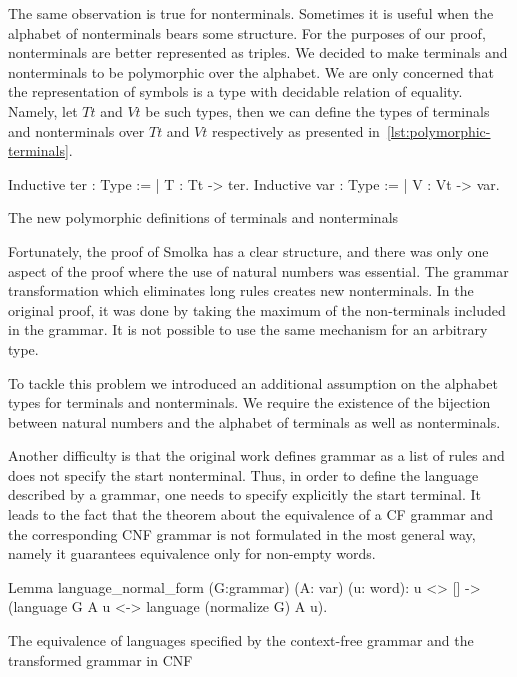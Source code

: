 The same observation is true for nonterminals. 
Sometimes it is useful when the alphabet of nonterminals bears some structure. 
For the purposes of our proof, nonterminals are better represented as triples. 
We decided to make terminals and nonterminals to be polymorphic over the alphabet.
We are only concerned that the representation of symbols is a type with decidable relation of equality. 
Namely, let $Tt$ and $Vt$ be such types, then we can define the types of terminals and nonterminals over  $Tt$ and $Vt$ respectively as presented in~\ref{lst:polymorphic-terminals}.

\begin{listing}[h]
    \begin{pyglist}[language=coq, numbers=none, numbersep=5pt]
  Inductive ter : Type := | T : Tt -> ter.
  Inductive var : Type := | V : Vt -> var.
    \end{pyglist}
    \caption{The new polymorphic definitions of terminals and nonterminals}
    \label{lst:polymorphic-terminals}
\end{listing}

Fortunately, the proof of Smolka has a clear structure, and there was only one aspect of the proof where the use of natural numbers was essential. The grammar transformation which eliminates long rules creates new nonterminals. In the original proof, it was done by taking the maximum of the non-terminals included in the grammar. 
It is not possible to use the same mechanism for an arbitrary type. 

To tackle this problem we introduced an additional assumption on the alphabet types for terminals and nonterminals. We require the existence of the bijection between natural numbers and the alphabet of terminals as well as nonterminals.

Another difficulty is that the original work defines grammar as a list of rules and does not specify the start nonterminal. Thus, in order to define the language described by a  grammar, one needs to specify explicitly the start terminal. It leads to the fact that the theorem about the equivalence of a CF grammar and the corresponding CNF grammar is not formulated in the most general way, namely it guarantees equivalence only for non-empty words. 

\begin{listing}[h]
    \begin{pyglist}[language=coq, numbers=none, numbersep=5pt]
  Lemma language_normal_form 
      (G:grammar) (A: var) (u: word):
    u <> [] -> 
    (language G A u <-> 
       language (normalize G) A u).
    \end{pyglist}
    \caption{The equivalence of languages specified by the context-free grammar and the transformed grammar in CNF}
    \label{lst:verbments1}
\end{listing}

